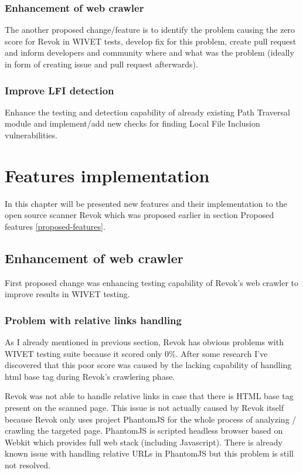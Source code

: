 		\subsection{Enhancement of web crawler}	
		
		The another proposed change/feature is to identify the problem causing the zero score for Revok in WIVET tests, develop fix for this problem, create pull request and inform developers and community where and what was the problem (ideally in form of creating issue and pull request afterwards). 
		
		\subsection{Improve LFI detection}
		
		Enhance the testing and detection capability of already existing Path Traversal module and implement/add new checks for finding Local File Inclusion vulnerabilities. 
		

\chapter{Features implementation}\label{features-implementation}

	In this chapter will be presented new features and their implementation to the open source scanner Revok which was proposed earlier in section Proposed features \ref{proposed-features}.

	\section{Enhancement of web crawler}
	
	First proposed change was enhancing testing capability of Revok's web crawler to improve results  in WIVET testing.
	
		\subsection{Problem with relative links handling}\label{crawler-problem-1}
	
		As I already mentioned in previous section, Revok has obvious problems with WIVET testing suite because it scored only 0\%. After some research I've discovered that this poor score was caused by the lacking capability of handling html base tag during Revok's crawlering phase. 
	
		Revok was not able to handle relative links in case that there is HTML base tag present on the scanned page. This issue is not actually caused by Revok itself because Revok only uses project PhantomJS  \cite{phantomjs} for the whole process of analyzing / crawling the targeted page. PhantomJS is scripted headless browser based on Webkit which provides full web stack (including Javascript). There is already known issue \cite{phantomJSissue} with handling relative URLs in PhantomJS but this problem is still not resolved.
	
